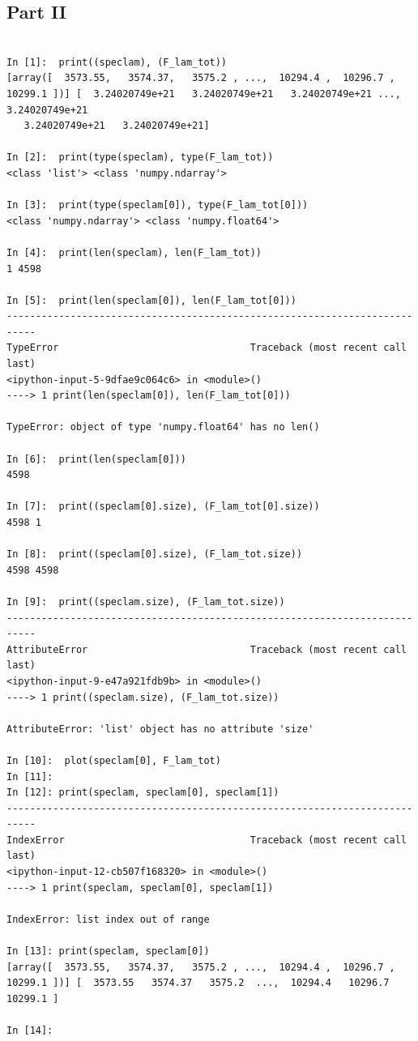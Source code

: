 \documentclass[11pt,a4paper]{article}
\begin{document}
\subsection{Part II}
\begin{lstlisting}

In [1]:  print((speclam), (F_lam_tot))
[array([  3573.55,   3574.37,   3575.2 , ...,  10294.4 ,  10296.7 ,  10299.1 ])] [  3.24020749e+21   3.24020749e+21   3.24020749e+21 ...,   3.24020749e+21
   3.24020749e+21   3.24020749e+21]

In [2]:  print(type(speclam), type(F_lam_tot))
<class 'list'> <class 'numpy.ndarray'>

In [3]:  print(type(speclam[0]), type(F_lam_tot[0]))
<class 'numpy.ndarray'> <class 'numpy.float64'>

In [4]:  print(len(speclam), len(F_lam_tot))
1 4598

In [5]:  print(len(speclam[0]), len(F_lam_tot[0]))
---------------------------------------------------------------------------
TypeError                                 Traceback (most recent call last)
<ipython-input-5-9dfae9c064c6> in <module>()
----> 1 print(len(speclam[0]), len(F_lam_tot[0]))

TypeError: object of type 'numpy.float64' has no len()

In [6]:  print(len(speclam[0]))
4598

In [7]:  print((speclam[0].size), (F_lam_tot[0].size))
4598 1

In [8]:  print((speclam[0].size), (F_lam_tot.size))
4598 4598

In [9]:  print((speclam.size), (F_lam_tot.size))
---------------------------------------------------------------------------
AttributeError                            Traceback (most recent call last)
<ipython-input-9-e47a921fdb9b> in <module>()
----> 1 print((speclam.size), (F_lam_tot.size))

AttributeError: 'list' object has no attribute 'size'

In [10]:  plot(speclam[0], F_lam_tot)
In [11]: 
In [12]: print(speclam, speclam[0], speclam[1])
---------------------------------------------------------------------------
IndexError                                Traceback (most recent call last)
<ipython-input-12-cb507f168320> in <module>()
----> 1 print(speclam, speclam[0], speclam[1])

IndexError: list index out of range

In [13]: print(speclam, speclam[0])
[array([  3573.55,   3574.37,   3575.2 , ...,  10294.4 ,  10296.7 ,  10299.1 ])] [  3573.55   3574.37   3575.2  ...,  10294.4   10296.7   10299.1 ]

In [14]: 


\end{lstlisting}
\end{document}
